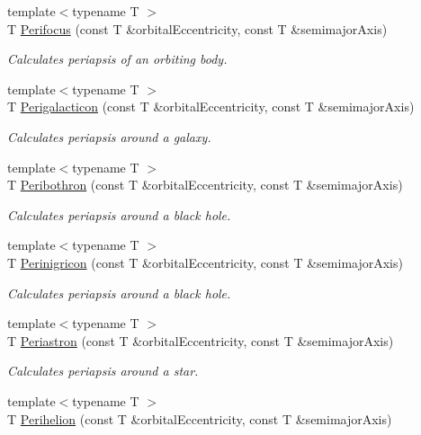 \begin{DoxyCompactItemize}
{\footnotesize template$<$typename T $>$ }\\T \mbox{\hyperlink{group___e_g_x_phys-_periapsis_gaff62669fb364a245cb85f9a91d8ea71f}{Perifocus}} (const T \&orbital\+Eccentricity, const T \&semimajor\+Axis)
\begin{DoxyCompactList}\small\item\em Calculates periapsis of an orbiting body. \end{DoxyCompactList}\item 
{\footnotesize template$<$typename T $>$ }\\T \mbox{\hyperlink{group___e_g_x_phys-_periapsis_ga074fecab96b90bebffa512a37e52d90b}{Perigalacticon}} (const T \&orbital\+Eccentricity, const T \&semimajor\+Axis)
\begin{DoxyCompactList}\small\item\em Calculates periapsis around a galaxy. \end{DoxyCompactList}\item 
{\footnotesize template$<$typename T $>$ }\\T \mbox{\hyperlink{group___e_g_x_phys-_periapsis_gada5892309279a3a687c4eb2f88238e4e}{Peribothron}} (const T \&orbital\+Eccentricity, const T \&semimajor\+Axis)
\begin{DoxyCompactList}\small\item\em Calculates periapsis around a black hole. \end{DoxyCompactList}\item 
{\footnotesize template$<$typename T $>$ }\\T \mbox{\hyperlink{group___e_g_x_phys-_periapsis_ga99d86af90179994e17158b082c502fd4}{Perinigricon}} (const T \&orbital\+Eccentricity, const T \&semimajor\+Axis)
\begin{DoxyCompactList}\small\item\em Calculates periapsis around a black hole. \end{DoxyCompactList}\item 
{\footnotesize template$<$typename T $>$ }\\T \mbox{\hyperlink{group___e_g_x_phys-_periapsis_ga477de6824cbb5986cdae923141e21648}{Periastron}} (const T \&orbital\+Eccentricity, const T \&semimajor\+Axis)
\begin{DoxyCompactList}\small\item\em Calculates periapsis around a star. \end{DoxyCompactList}\item 
{\footnotesize template$<$typename T $>$ }\\T \mbox{\hyperlink{group___e_g_x_phys-_periapsis_ga941d285e3a0b48ada9c9f60925ff63c2}{Perihelion}} (const T \&orbital\+Eccentricity, const T \&semimajor\+Axis)

\end{DoxyCompactItemize}
